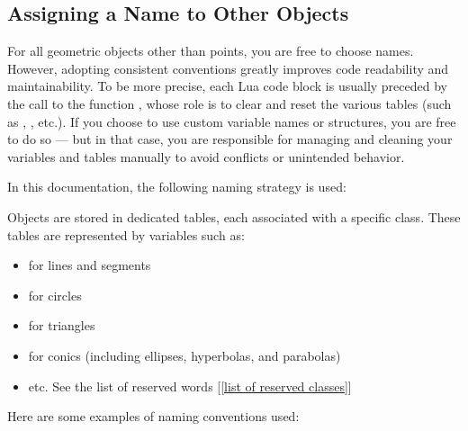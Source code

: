 \subsection{Assigning a Name to Other Objects}
For all geometric objects other than points, you are free to choose names. However, adopting consistent conventions greatly improves code readability and maintainability. To be more precise, each Lua code block is usually preceded by the call to the function , whose role is to clear and reset the various tables (such as , , etc.).
If you choose to use custom variable names or structures, you are free to do so — but in that case, you are responsible for managing and cleaning your variables and tables manually to avoid conflicts or unintended behavior.

In this documentation, the following naming strategy is used:


Objects are stored in dedicated tables, each associated with a specific class.
These tables are represented by variables such as:
\begin{itemize}

\item {} for lines and segments
\item {} for circles
\item {} for triangles
\item  {} for conics (including ellipses, hyperbolas, and parabolas)

\item  etc. See the list of reserved words [\ref{list of reserved classes}]
\end{itemize}

Here are some examples of naming conventions used:


